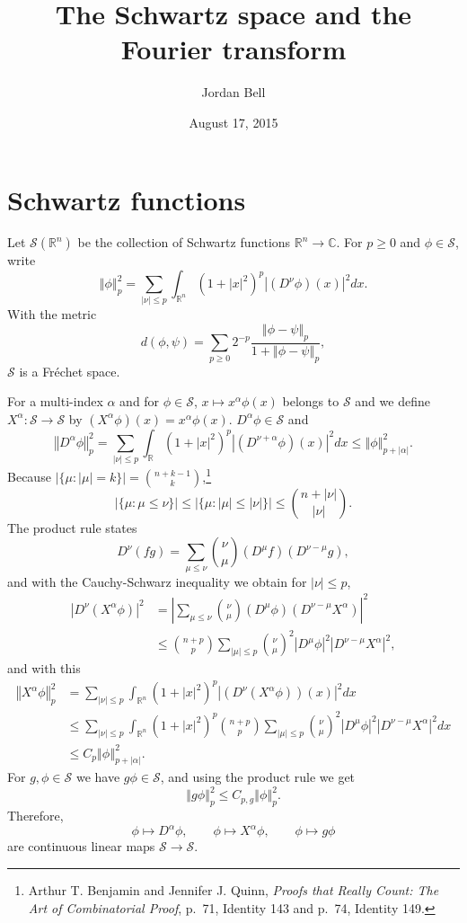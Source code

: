 \documentclass{article}
\newcommand{\norm}[1]{\left\Vert #1 \right\Vert}
\theoremstyle{definition}
\begin{document}
\title{The Schwartz space and the Fourier transform}
\author{Jordan Bell}
\date{August 17, 2015}

\maketitle

\section{Schwartz functions}
Let $\mathscr{S}(\mathbb{R}^n)$ be the collection of Schwartz functions $\mathbb{R}^n \to \mathbb{C}$.
For $p \geq 0$ and $\phi \in \mathscr{S}$, write
\[
\norm{\phi}_p^2 = \sum_{|\nu| \leq p} \int_{\mathbb{R}^n} (1+|x|^2)^p |(D^\nu \phi)(x)|^2 dx.
\]
With the metric
\[
d(\phi,\psi) = \sum_{p \geq 0} 2^{-p} \frac{\norm{\phi-\psi}_p}{1+\norm{\phi-\psi}_p},
\]
$\mathscr{S}$ is a Fr\'echet space. 

For a multi-index $\alpha$ and for $\phi \in \mathscr{S}$, 
$x \mapsto x^\alpha \phi(x)$ belongs to $\mathscr{S}$ and we define
$X^\alpha:\mathscr{S} \to \mathscr{S}$ by $(X^\alpha \phi)(x) = x^\alpha \phi(x)$. 
$D^\alpha \phi \in \mathscr{S}$ and
\[
\norm{D^\alpha \phi}_p^2 = \sum_{|\nu| \leq p} \int_{\mathbb{R}} (1+|x|^2)^p 
|(D^{\nu+\alpha} \phi)(x)|^2 dx
\leq \norm{\phi}_{p+|\alpha|}^2.
\]
Because $|\{\mu: |\mu| = k\}|=\binom{n+k-1}{k}$,\footnote{Arthur T. Benjamin and Jennifer J. Quinn,
{\em Proofs that Really Count: The Art of Combinatorial Proof}, p.~71, Identity 143 and p.~74, Identity 149.}
\[
|\{\mu: \mu \leq \nu\}| \leq |\{\mu: |\mu| \leq |\nu|\}| \leq \binom{n+|\nu|}{|\nu|}.
\]
The product rule states
\[
D^\nu (fg) = \sum_{\mu \leq \nu} \binom{\nu}{\mu} (D^\mu f) (D^{\nu-\mu}g),
\]
and with the Cauchy-Schwarz inequality we obtain for $|\nu| \leq p$,
\begin{align*}
|D^\nu (X^\alpha \phi)|^2&=\left| \sum_{\mu \leq \nu} \binom{\nu}{\mu}  (D^\mu \phi) 
(D^{\nu-\mu} X^\alpha) \right|^2\\
&\leq \binom{n+p}{p} \sum_{|\mu| \leq p} \binom{\nu}{\mu}^2 
 |D^\mu \phi|^2
|D^{\nu-\mu} X^\alpha|^2,
\end{align*}
and with this
\begin{align*}
\norm{X^\alpha \phi}_p^2& = \sum_{|\nu| \leq p} \int_{\mathbb{R}^n} (1+|x|^2)^p |(D^\nu (X^\alpha \phi))(x)|^2 dx\\
&\leq\sum_{|\nu| \leq p} \int_{\mathbb{R}^n} (1+|x|^2)^p 
\binom{n+p}{p} \sum_{|\mu| \leq p} \binom{\nu}{\mu}^2 
 |D^\mu \phi|^2
|D^{\nu-\mu} X^\alpha|^2 dx\\
&\leq C_p \norm{\phi}_{p+|\alpha|}^2.
\end{align*}
For $g,\phi \in \mathscr{S}$ we have $g \phi \in \mathscr{S}$, and using the product rule we get
\[
\norm{g \phi}_p^2 \leq C_{p,g} \norm{\phi}_p^2.
\]
Therefore, 
\[
\phi \mapsto D^\alpha \phi,\qquad \phi \mapsto X^\alpha \phi,\qquad \phi \mapsto g \phi
\]
are continuous linear maps $\mathscr{S} \to \mathscr{S}$.
\end{document}
